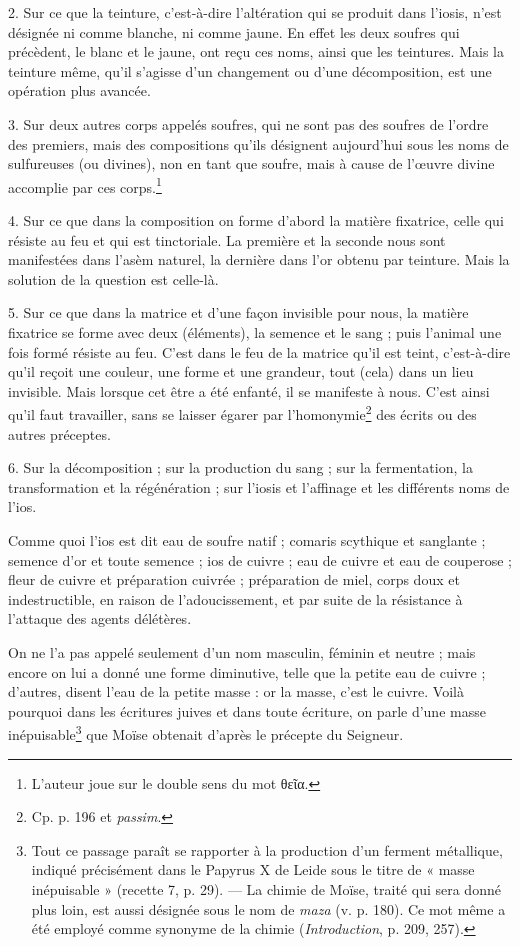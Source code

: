 \documentclass[a4paper, 11pt, oneside, polutonikogreek, french]{article}
\begin{document}
2. Sur ce que la teinture, c'est-à-dire l'altération qui se produit dans l'iosis, n'est désignée ni comme blanche, ni comme jaune. En effet les deux soufres qui précèdent, le blanc et le jaune, ont reçu ces noms, ainsi que les teintures. Mais la teinture même, qu'il s'agisse d'un changement ou d'une décomposition, est une opération plus avancée.

3. Sur deux autres corps appelés soufres, qui ne sont pas des soufres de l'ordre des premiers, mais des compositions qu'ils désignent aujourd'hui sous les noms de sulfureuses (ou divines), non en tant que soufre, mais à cause de l'œuvre divine accomplie par ces corps.\footnote{L'auteur joue sur le double sens du mot θεῖα.}

4. Sur ce que dans la composition on forme d'abord la matière fixatrice, celle qui résiste au feu et qui est tinctoriale. La première et la seconde nous sont manifestées dans l'asèm naturel, la dernière dans l'or obtenu par teinture. Mais la solution de la question est celle-là.

5. Sur ce que dans la matrice et d'une façon invisible pour nous, la matière fixatrice se forme avec deux (éléments), la semence et le sang ; puis l'animal une fois formé résiste au feu. C'est dans le feu de la matrice qu'il est teint, c'est-à-dire qu'il reçoit une couleur, une forme et une grandeur, tout (cela) dans un lieu invisible. Mais lorsque cet être a été enfanté, il se manifeste à nous. C'est ainsi qu'il faut travailler, sans se laisser égarer par l'homonymie\footnote{Cp. p. 196 et \emph{passim}.} des écrits ou des autres préceptes.

6. Sur la décomposition ; sur la production du sang ; sur la fermentation, la transformation et la régénération ; sur l'iosis et l'affinage et les différents noms de l'ios.

Comme quoi l'ios est dit eau de soufre natif ; comaris scythique et sanglante ; semence d'or et toute semence ; ios de cuivre ; eau de cuivre et eau de couperose ; fleur de cuivre et préparation cuivrée ; préparation de miel, corps doux et indestructible, en raison de l'adoucissement, et par suite de la résistance à l'attaque des agents délétères.

On ne l'a pas appelé seulement d'un nom masculin, féminin et neutre ; mais encore on lui a donné une forme diminutive, telle que la petite eau de cuivre ; d'autres, disent l'eau de la petite masse : or la masse, c'est le cuivre. Voilà pourquoi dans les écritures juives et dans toute écriture, on parle d'une masse inépuisable\footnote{Tout ce passage paraît se rapporter à la production d'un ferment métallique, indiqué précisément dans le Papyrus X de Leide sous le titre de « masse inépuisable » (recette 7, p. 29). --- La chimie de Moïse, traité qui sera donné plus loin, est aussi désignée sous le nom de \emph{maza} (v. p. 180). Ce mot même a été employé comme synonyme de la chimie (\emph{Introduction}, p. 209, 257).} que Moïse obtenait d'après le précepte du Seigneur.
\end{document}
